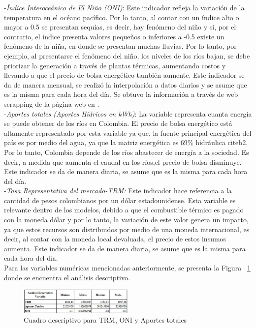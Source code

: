 \documentclass[conference, 10pt]{IEEEtran}
\begin{document}
-\textit{Índice Interoceánico de El Niño (ONI)}: Este indicador refleja la variación de la temperatura en el océano pacífico. Por lo tanto, al contar con un índice alto o mayor a 0.5 se presentan sequías, es decir, hay fenómeno del niño y si, por el contrario, el índice presenta valores pequeños o inferiores a -0.5 existe un fenómeno de la niña, en donde se presentan muchas lluvias. Por lo tanto, por ejemplo, al presentarse el fenómeno del niño, los niveles de los ríos bajan, se debe priorizar la generación a través de plantas térmicas, aumentando costos y llevando a que el precio de bolsa energético también aumente. Este indicador se da de manera mensual, se realizó la interpolación a datos diarios y se asume que es la misma para cada hora del día. Se obtuvo la información a través de web scrapping de la página web en \cite{b3}.\\

-\textit{Aportes totales (Aportes Hídricos en kWh)}: La variable representa cuanta energía se puede obtener de los ríos en Colombia. El precio de bolsa energético está altamente representado por esta variable ya que, la fuente principal energética del país es por medio del agua, ya que la matriz energética es 69\% hidráulica cite{b2}. Por lo tanto, Colombia depende de los ríos abastecer de energía a la sociedad. Es decir, a medida que aumenta el caudal en los ríos,el precio de bolsa disminuye. Este indicador se da de manera diaria, se asume que es la misma para cada hora del día.\\

-\textit{Tasa Representativa del mercado-TRM:} Este indicador hace referencia a la cantidad de pesos colombianos por un dólar estadounidense. Esta variable es relevante dentro de los modelos, debido a que el combustible térmico es pagado con la moneda dólar y por lo tanto, la variación de este valor genera un impacto, ya que estos recursos son distribuidos por medio de una moneda internacional, es decir, al contar con la moneda local devaluada, el precio de estos insumos aumenta. Este indicador se da de manera diaria, se asume que es la misma para cada hora del día.\\

Para las variables numéricas mencionadas anteriormente, se presenta la Figura ~\ref{fig_6} donde se encuentra el análisis descriptivo. 

\begin{figure}[htbp]
\centerline{\includegraphics[width=0.5\textwidth]{../Images/Cuadro_descriptivo_varias_var.png}}
\caption{Cuadro descriptivo para TRM, ONI y Aportes totales}
\label{fig_6}
\end{figure}
\end{document}
